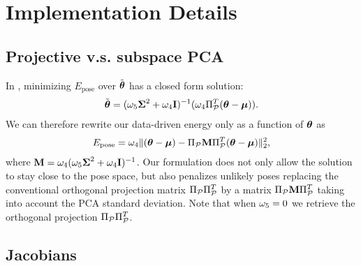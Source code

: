 \section{Implementation Details}

\subsection{Projective v.s. subspace PCA}
\label{app:pca}
In , minimizing $E_{\text{pose}}$ over $\tilde{\boldsymbol{\theta}}$ has a closed form solution:
%
\begin{eqnarray*}
\tilde{\boldsymbol{\theta}} = (\omega_5\boldsymbol{\Sigma}^2 + \omega_4\mathbf{I})^{-1}(\omega_4\Pi_{\mathcal{P}}^T (\boldsymbol{\theta} - \boldsymbol{\mu})).  
\label{eq:pcaproj2}
\end{eqnarray*}
%
We can therefore rewrite our data-driven energy only as a function of $\boldsymbol{\theta}$ as 
% 
\begin{eqnarray*}
E_{\text{pose}}  = \omega_4 \|(\boldsymbol{\theta} - \boldsymbol{\mu}) - \Pi_{\mathcal{P}}\mathbf{M}\Pi_{\mathcal{P}}^T (\boldsymbol{\theta} - \boldsymbol{\mu})\|_2^2,   
\label{eq:pcaproj3}
\end{eqnarray*}
% 
where $\mathbf{M} = \omega_4(\omega_5\boldsymbol{\Sigma}^2 + \omega_4\mathbf{I})^{-1}$.
Our formulation does not only allow the solution to stay close to the pose space, but also penalizes unlikely poses replacing the conventional orthogonal projection matrix $\Pi_{\mathcal{P}}\Pi_{\mathcal{P}}^T$ by a matrix $\Pi_{\mathcal{P}}\mathbf{M}\Pi_{\mathcal{P}}^T$ taking into account the PCA standard deviation. Note that when $\omega_5=0$ we retrieve the orthogonal projection  $\Pi_{\mathcal{P}}\Pi_{\mathcal{P}}^T$.

\vspace{-.15in}
\subsection{Jacobians}
\label{app:jacobians}

